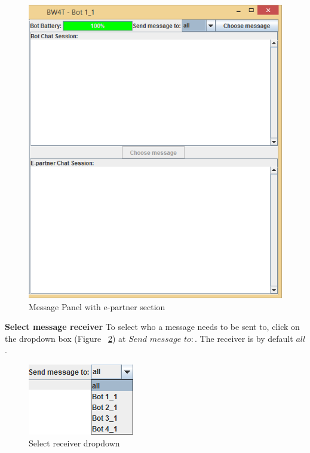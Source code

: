 \begin{figure}[h]
\begin{center}
\includegraphics{NewFeatures/hpg-right-epartner.png}
\end{center}
\caption{Message Panel with e-partner section}
\label{fig:mp2}
\end{figure}

\textbf{Select message receiver}
To select who a message needs to be sent to, click on the dropdown box (Figure ~\ref{fig:receiverDropDown}) at $Send$ $message$ $to:$. The receiver is by default $all$.
\\
\begin{figure}[h]
\begin{center}
\includegraphics{NewFeatures/hpg-bot-receiver.png}
\end{center}
\caption{Select receiver dropdown}
\label{fig:receiverDropDown}
\end{figure}

